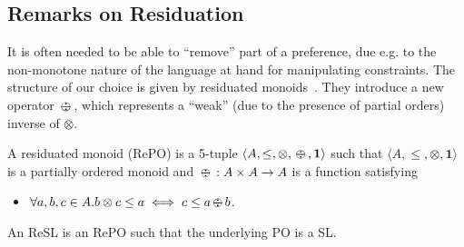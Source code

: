 \documentclass{llncs}
\def\monid{{\mathbf 0}}
\def\monop{\otimes}
\def\odiv{\, {\ominus\hspace{-7.7pt} \div} \,}
\def\monid{\mathbf{1}}
\begin{document}
\bigskip
%
%

%
%
%

\subsection{Remarks on Residuation}\label{sec:ror}
It is often needed to be able to ``remove'' part of a preference, due e.g. 
to the non-monotone nature of the language at hand
for manipulating constraints. 
%
The structure of our choice is given by residuated monoids~\cite{golanShort}. 
%
They introduce a new operator $\odiv$, which represents a ``weak'' (due to the presence of partial orders) inverse of $\otimes$.

\begin{definition}[residuation]\label{def:repo}
	A residuated monoid (RePO) is a 5-tuple $\langle A, \leq, \monop, \odiv, \monid \rangle$ such that
	$\langle A, \leq, \monop, \monid \rangle$ is a partially ordered monoid and
	$\odiv: A \times A \rightarrow A$ is a function satisfying 
	\begin{itemize}
		\item $\forall a, b, c \in A. b \monop c \leq a \iff c \leq a \odiv b$.
	\end{itemize}
	An ReSL is an RePO such that the underlying PO is a SL.
\end{definition}

%
\end{document}
